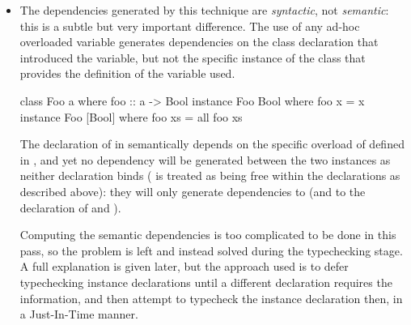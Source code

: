 \documentclass[dissertation.tex]{subfiles}
\begin{document}
{{\begin{itemize}
{            However, we treat binding declarations inside  declarations as actually being free uses
            rather than binding uses, so that the instance declaration forms a dependence on the class declaration where
            the variables are bound, ensuring it is typechecked first.

        }
        \item\label{sec:dependencies-syntactic-semantic}
        {

            The dependencies generated by this technique are \textit{syntactic}, not \textit{semantic}: this is a subtle
            but very important difference. The use of any ad-hoc overloaded variable generates dependencies on the class
            declaration that introduced the variable, but not the specific instance of the class that provides the
            definition of the variable used.

            \begin{haskellfigure}
            class Foo a where
                foo :: a -> Bool
            instance Foo Bool where
                foo x = x
            instance Foo [Bool] where
                foo xs = all foo xs
            \end{haskellfigure}

            The declaration of  in  semantically depends on the specific
            overload of  defined in , and yet no dependency will be generated
            between the two instances as neither declaration binds  ( is treated as being free
            within the declarations as described above): they will only generate dependencies to 
            (and to the declaration of  and ).

            Computing the semantic dependencies is too complicated to be done in this pass, so the problem is left and
            instead solved during the typechecking stage. A full explanation is given later, but the approach used is to
            defer typechecking instance declarations until a different declaration requires the information, and then
            attempt to typecheck the instance declaration then, in a Just-In-Time manner.

        }
        \end{itemize}
    }
}
\end{document}
